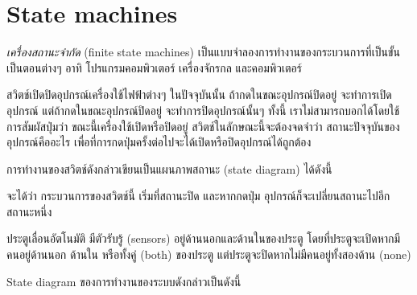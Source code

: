 \section{State machines}

\emph{เครื่องสถานะจำกัด} (finite state machines) เป็นแบบจำลองการทำงานของกระบวนการที่เป็นขั้นเป็นตอนต่างๆ อาทิ โปรแกรมคอมพิวเตอร์ เครื่องจักรกล และคอมพิวเตอร์

\begin{example}
สวิตช์เปิดปิดอุปกรณ์เครื่องใช้ไฟฟ้าต่างๆ ในปัจจุบันนั้น ถ้ากดในขณะอุปกรณ์ปิดอยู่ จะทำการเปิดอุปกรณ์ แต่ถ้ากดในขณะอุปกรณ์ปิดอยู่ จะทำการปิดอุปกรณ์นั้นๆ ทั้งนี้ เราไม่สามารถบอกได้โดยใช้การสัมผัสปุ่มว่า ขณะนี้เครื่องใช้เปิดหรือปิดอยู่ สวิตช์ในลักษณะนี้จะต้องจดจำว่า สถานะปัจจุบันของอุปกรณ์คืออะไร เพื่อที่การกดปุ่มครั้งต่อไปจะได้เปิดหรือปิดอุปกรณ์ได้ถูกต้อง

การทำงานของสวิตช์ดังกล่าวเขียนเป็นแผนภาพสถานะ (state diagram) ได้ดังนี้
\begin{center}
\end{center}
จะได้ว่า กระบวนการของสวิตช์นี้ เริ่มที่สถานะปิด และหากกดปุ่ม อุปกรณ์ก็จะเปลี่ยนสถานะไปอีกสถานะหนึ่ง
\end{example}

\begin{example}\label{ex:door-diagram}
ประตูเลื่อนอัตโนมัติ มีตัวรับรู้ (sensors) อยู่ด้านนอกและด้านในของประตู โดยที่ประตูจะเปิดหากมีคนอยู่ด้านนอก ด้านใน หรือทั้งคู่ (both) ของประตู แต่ประตูจะปิดหากไม่มีคนอยู่ทั้งสองด้าน (none)

State diagram ของการทำงานของระบบดังกล่าวเป็นดังนี้
\begin{center}
\end{center}
\end{example}

